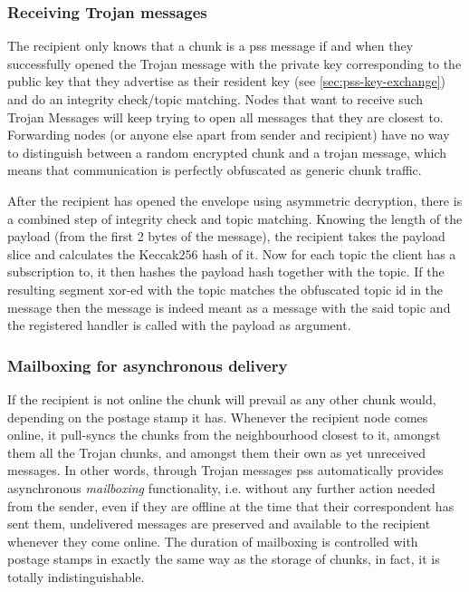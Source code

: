 \subsubsection{Receiving Trojan messages}

The recipient only knows that a chunk is a pss message if and when they successfully opened the Trojan message with the private key corresponding to the public key that they advertise as their resident key (see \ref{sec:pss-key-exchange}) and do an integrity check/topic matching. Nodes that want to receive such Trojan Messages will keep trying to open all messages that they are closest to. Forwarding nodes (or anyone else apart from sender and recipient) have no way to distinguish between a random encrypted chunk and a trojan message, which means that communication is perfectly obfuscated as generic chunk traffic.

After the recipient has opened the envelope using asymmetric decryption, there is a combined step of integrity check and topic matching. Knowing the length of the payload (from the first 2 bytes of the message), the recipient takes the payload slice and calculates the Keccak256 hash of it. Now for each topic the client has a subscription to, it then hashes the payload hash together with the topic. If the resulting segment xor-ed with the topic matches the obfuscated topic id in the message then the message is indeed meant as a message with the said topic and the registered handler is called with the payload as argument.

\subsubsection{Mailboxing for asynchronous delivery}

If the recipient is not online the chunk will prevail as any other chunk would, depending on the postage stamp it has. Whenever the recipient node comes online, it pull-syncs the chunks from the neighbourhood closest to it, amongst them all the Trojan chunks, and amongst them their own as yet unreceived messages. In other words, through Trojan messages pss automatically provides asynchronous \emph{mailboxing} functionality, i.e. 
without any further action needed from the sender, even if they are offline at the time that their correspondent has sent them, undelivered messages are preserved and available to the recipient whenever they come online. The duration of mailboxing is controlled with postage stamps in exactly the same way as the storage of chunks, in fact, it is totally indistinguishable.

